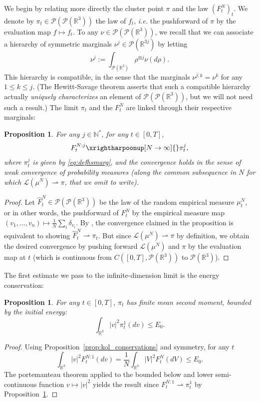 \documentclass[11pt,a4paper]{article}
\theoremstyle{definition}
\theoremstyle{plain}
\newtheorem{prop}[defi]{Proposition}
\begin{document}
We begin by relating more directly the cluster point $\pi$ and the law $(F^N_t)_t$. We denote by $\pi_t \in \mathcal{P}(\mathcal{P}(\mathbb{R}^3))$ the law of $f_t$, \textit{i.e.} the pushforward of $\pi$ by the evaluation map $f\mapsto f_t$. To any $\nu \in \mathcal{P}(\mathcal{P}(\mathbb{R}^3))$, we recall that we can associate a hierarchy of symmetric marginals $\nu^j \in \mathcal{P}(\mathbb{R}^{3j})$ by letting
\begin{equation}
\label{eq:defhsmarg}
    \nu^j:=\int_{\mathcal{P}(\mathbb{R}^3)} \rho^{\otimes j} \nu(d\rho).
\end{equation}
This hierarchy is compatible, in the sense that the marginals $\nu^{j:k}=\nu^k$ for any $1\leq k \leq j$. (The Hewitt-Savage theorem \cite{HewittSavage1955} asserts that such a compatible hierarchy actually \textit{uniquely characterizes} an element of $\mathcal{P}(\mathcal{P}(\mathbb{R}^3))$, but we will not need such a result.) The limit $\pi_t$ and the $F^N_t$ are linked through their respective marginals:
\begin{prop}
\label{prop:convFNj}
   For any $j\in\mathbb{N}^*$, for any $t\in[0,T]$,
   $$F^{N:j}_t \xrightharpoonup[N\rightarrow \infty]{}\pi_t^j,$$
   where $\pi_t^j$ is given by \eqref{eq:defhsmarg}, and the convergence holds in the sense of weak convergence of probability measures (along the common subsequence in $N$ for which $\mathcal{L}(\mu^N)\rightharpoonup \pi$, that we omit to write).
\end{prop}
\begin{proof}
    Let $\hat{F}^N_t\in\mathcal{P}(\mathcal{P}(\mathbb{R}^3))$ be the law of the random empirical measure $\mu^N_t$, or in other words, the pushforward of $F^N_t$ by the empirical measure map
    $(v_1,...,v_n)\mapsto \frac{1}{N}\sum_i \delta_{v_i}$.
    By \cite[Theorem 5.3, (1)]{HaurayMischler2012}, the convergence claimed in the proposition is equivalent to showing $\hat{F}^N_t \rightharpoonup \pi_t$. But since $\mathcal{L}(\mu^N) \rightharpoonup \pi$ by definition, we obtain the desired convergence by pushing forward $\mathcal{L}(\mu^N)$ and $\pi$ by the evaluation map at $t$ (which is continuous from $C([0,T],\mathcal{P}(\mathbb{R}^3))$ to $\mathcal{P}(\mathbb{R}^3)$).
\end{proof}

The first estimate we pass to the infinite-dimension limit is the energy conservation:
\begin{prop}
\label{prop:lvl3energy}
    For any $t\in[0,T]$, $\pi_t$ has finite mean second moment, bounded by the initial energy:
    $$\int_{\mathbb{R}^3} \vert v \vert^2 \pi^1_t(dv) \leq E_0.$$
\end{prop}
\begin{proof}
    Using Proposition~\ref{prop:kol_conservations} and symmetry, for any $t$
    $$\int_{\mathbb{R}^3} \vert v \vert^2 F^{N:1}_t(dv)=\frac{1}{N}\int_{\mathbb{R}^3} \vert V \vert^2 F^{N}_t(dV)\leq E_0.$$
    The portemanteau theorem applied to the bounded below and lower semi-continuous function $v \mapsto \vert v \vert^2$ yields the result since $F^{N:1}_t \rightharpoonup\pi_t^1$ by Proposition~\ref{prop:convFNj}.
\end{proof}
\end{document}
